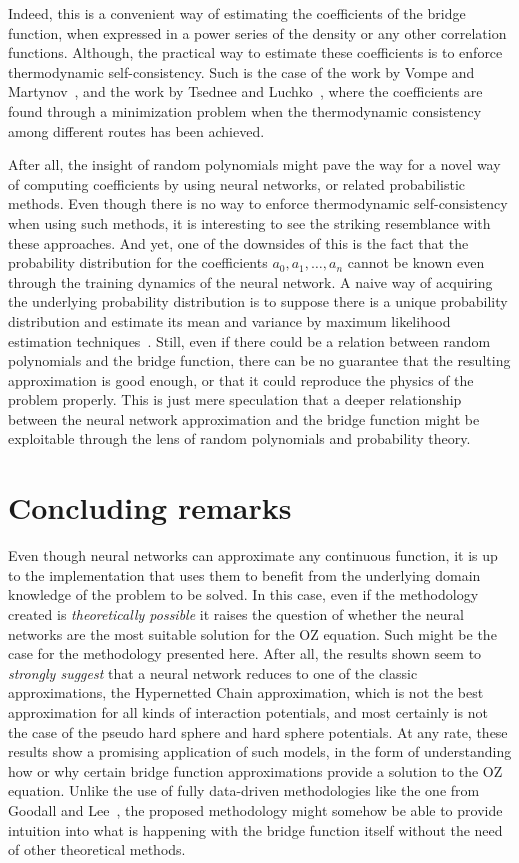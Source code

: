 Indeed, this is a convenient way of estimating the coefficients of the bridge function,
when expressed in a power series of the density or any other correlation functions.
Although, the practical way to estimate these coefficients is to enforce thermodynamic
self-consistency. Such is the case of the work by Vompe and Martynov~\cite{vompeBridgeFunctionExpansion1994},
and the work by Tsednee and Luchko~\cite{tsedneeClosureOrnsteinZernikeEquation2019}, where
the coefficients are found through a minimization problem when the thermodynamic consistency
among different routes has been achieved.

After all, the insight of random polynomials might pave the way for a novel way of 
computing coefficients by using neural networks, or related probabilistic methods.
Even though there is no way to enforce thermodynamic self-consistency when using such
methods, it is interesting to see the striking resemblance with these approaches.
And yet, one of the downsides of this is the fact that the probability
distribution for the coefficients $a_0, a_1, \dots , a_n$ cannot be known even through the
training dynamics of the neural network. A naive way of acquiring the underlying 
probability distribution is to suppose there is
a unique probability distribution and estimate its mean and variance by maximum likelihood
estimation techniques~\cite{hastieElementsStatisticalLearning2009}.
Still, even if there could be a relation between random polynomials and the bridge 
function, there can be no guarantee that the resulting approximation is good enough, or 
that it could reproduce the physics of the problem properly.
This is just mere speculation that a deeper relationship between the neural network 
approximation and the bridge function might be exploitable through the lens of random
polynomials and probability theory.

\section{Concluding remarks}
Even though neural networks can approximate any continuous function,
it is up to the implementation that uses them
to benefit from the underlying domain knowledge of the problem to be solved. In this case,
even if the methodology created is \emph{theoretically possible} it raises the question of
whether the neural networks are the most suitable solution for the OZ equation.
Such might be the case for the methodology presented here. After all, the results shown
seem to \emph{strongly suggest} that a neural network reduces to one of the classic 
approximations,
the Hypernetted Chain approximation, which is not the best approximation for all kinds
of interaction potentials, and most certainly is not the case of the pseudo hard sphere
and hard sphere potentials.
At any rate, these results show a promising application of such models, in the form of
understanding how or why certain bridge function approximations provide a solution to the 
OZ equation. Unlike the use of fully data-driven methodologies like the one from
Goodall and Lee~\cite{a.goodallDatadrivenApproximationsBridge2021},
the proposed methodology might somehow be able to provide intuition into what is happening
with the bridge function itself without the need of other theoretical methods.

